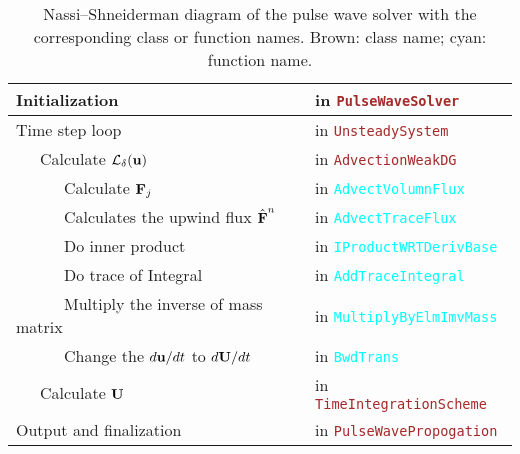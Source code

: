 \begin{table}[h]
\centering
\caption{Nassi–Shneiderman diagram of the pulse wave solver with the corresponding class or function names. Brown: class name; cyan: function name.}
\renewcommand\arraystretch{1.2}
\begin{tabular}{|ll|}
\hline
Initialization&in \texttt{\textcolor{brown}{PulseWaveSolver}}\\
\hline
Time step loop&in \texttt{\textcolor{brown}{UnsteadySystem}}\\
\hline
\ \ \ Calculate $\mathcal{L}_\delta(\textbf u)$&in \texttt{\textcolor{brown}{AdvectionWeakDG}} \\
\hline
\ \ \ \ \ \ Calculate $\textbf F_j$ &in \texttt{\textcolor{cyan}{AdvectVolumnFlux}}\\
\hline
\ \ \ \ \ \ Calculates the upwind flux $\hat{\textbf F}^n$ &in \texttt{\textcolor{cyan}{AdvectTraceFlux}}\\
\hline
\ \ \ \ \ \ Do inner product&in \texttt{\textcolor{cyan}{IProductWRTDerivBase}}\\
\hline
\ \ \ \ \ \ Do trace of Integral&in \texttt{\textcolor{cyan}{AddTraceIntegral}}\\
\hline
\ \ \ \ \ \ Multiply the inverse of mass matrix&in \texttt{\textcolor{cyan}{MultiplyByElmImvMass}}
\\ \hline
\ \ \ \ \ \ Change the $d\textbf u/dt$ to $d\textbf U/dt$&in \texttt{\textcolor{cyan}{BwdTrans}}\\
\hline
\ \ \  Calculate $\textbf U$ &in \texttt{\textcolor{brown}{TimeIntegrationScheme}}\\
\hline
Output and finalization&in \texttt{\textcolor{brown}{PulseWavePropogation}}\\
\hline
\end{tabular}

\label{tab:wei1}
\end{table}
